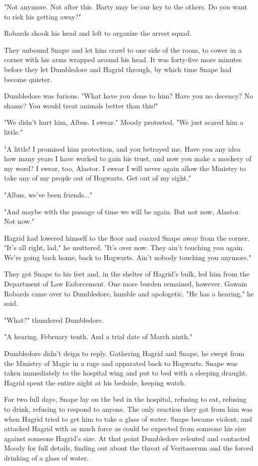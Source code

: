 "Not anymore. Not after this. Barty may be our key to the others. Do you want to risk his getting away?"

Robards shook his head and left to organize the arrest squad.

They unbound Snape and let him crawl to one side of the room, to cower in a corner with his arms wrapped around his head. It was forty-five more minutes before they let Dumbledore and Hagrid through, by which time Snape had become quieter.

Dumbledore was furious. "What have you done to him? Have you no decency? No shame? You would treat animals better than this!"

"We didn't hurt him, Albus. I swear." Moody protested. "We just scared him a little."

"A little! I promised him protection, and you betrayed me. Have you any idea how many years I have worked to gain his trust, and now you make a mockery of my word? I swear, too, Alastor. I swear I will never again allow the Ministry to take any of my people out of Hogwarts. Get out of my sight."

"Albus, we've been friends..."

"And maybe with the passage of time we will be again. But not now, Alastor. Not now."

Hagrid had lowered himself to the floor and coaxed Snape away from the corner. "It's all right, lad," he muttered. "It's over now. They ain't touching you again. We're going back home, back to Hogwarts. Ain't nobody touching you anymore."

They got Snape to his feet and, in the shelter of Hagrid's bulk, led him from the Department of Law Enforcement. One more burden remained, however. Gawain Robards came over to Dumbledore, humble and apologetic. "He has a hearing," he said.

"What?" thundered Dumbledore.

"A hearing. February tenth. And a trial date of March ninth."

Dumbledore didn't deign to reply. Gathering Hagrid and Snape, he swept from the Ministry of Magic in a rage and apparated back to Hogwarts. Snape was taken immediately to the hospital wing and put to bed with a sleeping draught. Hagrid spent the entire night at his bedside, keeping watch.

For two full days, Snape lay on the bed in the hospital, refusing to eat, refusing to drink, refusing to respond to anyone. The only reaction they got from him was when Hagrid tried to get him to take a glass of water. Snape became violent, and attacked Hagrid with as much force as could be expected from someone his size against someone Hagrid's size. At that point Dumbledore relented and contacted Moody for full details, finding out about the threat of Veritaserum and the forced drinking of a glass of water.

